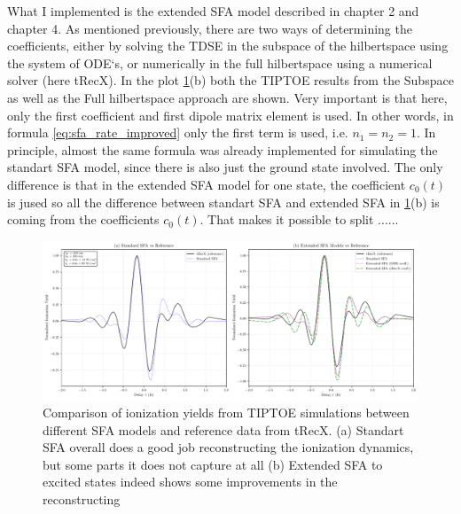 What I implemented is the extended SFA model described in chapter 2 and chapter 4. 
As mentioned previously, there are two ways of determining the coefficients, either by solving the TDSE in the subspace of the hilbertspace using the system of ODE`s, or numerically in the full hilbertspace using a numerical solver (here tRecX).
In the plot \ref{fig:tiptoe_sfa_comparison}(b) both the TIPTOE results from the Subspace as well as the Full hilbertspace approach are shown.
Very important is that here, only the first coefficient and first dipole matrix element is used.
In other words, in formula \eqref{eq:sfa_rate_improved} only the first term is used, i.e. $n_1=n_2=1$.
In principle, almost the same formula was already implemented for simulating the standart SFA model, since there is also just the ground state involved.
The only difference is that in the extended SFA model for one state, the coefficient $c_0(t)$ is jused so all the difference between standart SFA and extended SFA in \ref{fig:tiptoe_sfa_comparison}(b) is coming from the coefficients $c_0(t)$.
That makes it possible to split ......



\begin{figure}
    \centering
    \includegraphics[width=1\textwidth]{../ionModel/python/plotsTIPTOE/2plot_SFA-comparison_1.pdf}
    \caption{Comparison of ionization yields from TIPTOE simulations between different SFA models and reference data from tRecX. 
            (a) Standart SFA overall does a good job reconstructing the ionization dynamics, but some parts it does not capture at all 
            (b) Extended SFA to excited states indeed shows some improvements in the reconstructing}
    \label{fig:tiptoe_sfa_comparison}
\end{figure}








